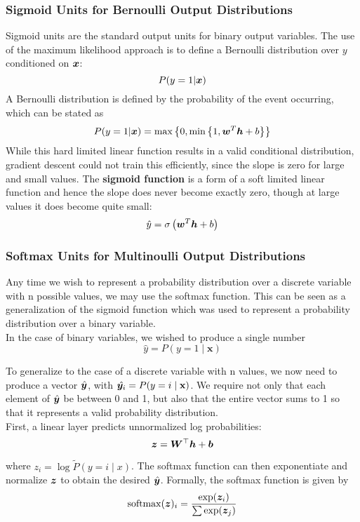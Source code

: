 \begin{multicols}{2}
	\subsubsection{Sigmoid Units for Bernoulli Output Distributions}
	Sigmoid units are the standard output units for binary output variables.
	The use of the maximum likelihood approach is to define a Bernoulli distribution over $y$ conditioned on $\bol{x}$:
	\[ P(y=1|\bol{x}) \]
	A Bernoulli distribution is defined by the probability of the event occurring, which can be stated as
	\[ P(y=1|\bol{x}) = \max \left\{ 0,\min \left\{ 1, \bol{w}^T\bol{h}+b \right\} \right\} \]
	While this hard limited linear function results in a valid conditional distribution, gradient descent could not train this efficiently, since the slope is zero for large and small values.
	The \textbf{sigmoid function} is a form of a soft limited linear function and hence the slope does never become exactly zero, though at large values it does become quite small:
	\[ \hat{y} = \sigma \left(\bol{w}^T\bol{h}+b\right) \]


	\subsubsection{Softmax Units for Multinoulli Output Distributions}
	Any time we wish to represent a probability distribution over a discrete variable with n possible values, we may use the softmax function. This can be seen as a	generalization of the sigmoid function which was used to represent a probability distribution over a binary variable.\\
	In the case of binary variables, we wished to produce a single number
	\[ \hat{y} = P(y = 1 \mid \textbf{x})\]

	To generalize to the case of a discrete variable with n values, we now need	to produce a vector $\hat{{\bm{y}}}$, with $\hat{{\bm{y}}_{i}} = P(y = i \mid \textbf{x})$. We require not only that each element of $\hat{{\bm{y}}}$ be between 0 and 1, but also that the entire vector sums to 1 so that it represents a valid probability distribution.\\
	First, a linear	layer predicts unnormalized log probabilities:
	\[ {\bm{z}} =  {\bm{W}}^\top {\bm{h}} + {\bm{b}}\]

	where $z_{i} = \log\tilde{P}(y = i \mid x)$. The softmax function can then exponentiate and	normalize ${\bm{z}}$ to obtain the desired $\hat{{\bm{y}}}$. Formally, the softmax function is given by
	\[ \mathrm{softmax}({\bm{z}})_{i} = \frac{\exp({\bm{z}}_{i})}{\sum \exp({\bm{z}}_{j})} \]


\end{multicols}
